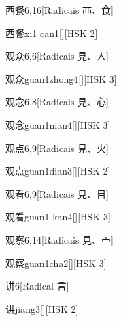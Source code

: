 \begin{entry}{西餐}{6,16}[Radicais ⾑、⾷]
  \begin{phonetics}{西餐}{xi1 can1}[][HSK 2]
  \end{phonetics}
\end{entry}

\begin{entry}{观众}{6,6}[Radicais ⾒、⼈]
  \begin{phonetics}{观众}{guan1zhong4}[][HSK 3]
  \end{phonetics}
\end{entry}

\begin{entry}{观念}{6,8}[Radicais ⾒、⼼]
  \begin{phonetics}{观念}{guan1nian4}[][HSK 3]
  \end{phonetics}
\end{entry}

\begin{entry}{观点}{6,9}[Radicais ⾒、⽕]
  \begin{phonetics}{观点}{guan1dian3}[][HSK 2]
  \end{phonetics}
\end{entry}

\begin{entry}{观看}{6,9}[Radicais ⾒、⽬]
  \begin{phonetics}{观看}{guan1 kan4}[][HSK 3]
  \end{phonetics}
\end{entry}

\begin{entry}{观察}{6,14}[Radicais ⾒、⼧]
  \begin{phonetics}{观察}{guan1cha2}[][HSK 3]
  \end{phonetics}
\end{entry}

\begin{entry}{讲}{6}[Radical ⾔]
  \begin{phonetics}{讲}{jiang3}[][HSK 2]
  \end{phonetics}
\end{entry}

